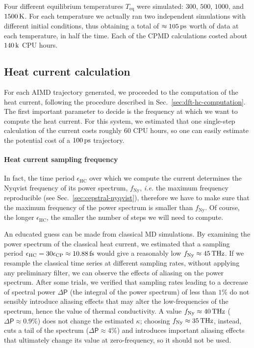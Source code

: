 Four different equilibrium temperatures $T_\mathrm{eq}$ were simulated: $300$, $500$, $1000$, and $1500\,\mathrm{K}$. For each temperature we actually ran two independent simulations with different initial conditions, thus obtaining a total of $\approx 105\,\mathrm{ps}$ worth of data at each temperature, in half the time. 
Each of the CPMD calculations costed about $140\,\mathrm{k}$ CPU hours.



\subsection{Heat current calculation}  \label{sec:results-quantum-current}
For each AIMD trajectory generated, we proceeded to the computation of the \abinitio heat current, following the procedure described in Sec.~\ref{sec:dft-hc-computation}. 
The first important parameter to decide is the frequency at which we want to compute the heat current. For this system, we estimated that one single-step calculation of the current costs roughly $60$ CPU hours, so one can easily estimate the potential cost of a $100\,\mathrm{ps}$ trajectory. 


\paragraph{Heat current sampling frequency}
In fact, the time period $\epsilon_\mathrm{HC}$ over which we compute the current determines the Nyqvist frequency of its power spectrum, $f_\mathrm{Ny}$, \emph{i.e.} the maximum frequency reproducible (see Sec.~\ref{sec:cepstral-nyqvist}), therefore we have to make sure that the maximum frequency of the power spectrum is smaller than $f_\mathrm{Ny}$. Of course, the longer $\epsilon_\mathrm{HC}$, the smaller the number of steps we will need to compute. 

An educated guess can be made from classical MD simulations. By examining the power spectrum of the classical heat current, we estimated that a sampling period $\epsilon_\mathrm{HC} = 30 \epsilon_\mathrm{CP} \approx 10.88\,\mathrm{fs}$ would give a reasonably low $f_\mathrm{Ny}\approx 45\,\mathrm{THz}$. 
If we resample the classical time series at different sampling rates, without applying any preliminary filter, we can observe the effects of aliasing on the power spectrum. 
After some trials, we verified that sampling rates leading to a decrease of spectral power $\Delta\mathsf{P}$ (the integral of the power spectrum) of less than $1\%$ do not sensibly introduce aliasing effects that may alter the low-frequencies of the spectrum, hence the value of thermal conductivity. A value $f_\mathrm{Ny} \approx 40\,\mathrm{THz}$ ($\Delta\mathsf{P} \approx 0.9\%$) does not change the estimated $\kappa$; choosing $f_\mathrm{Ny} \approx 35\,\mathrm{THz}$, instead, cuts a tail of the spectrum ($\Delta\mathsf{P} \approx 4\%$) and introduces important aliasing effects that ultimately change its value at zero-frequency, so it should not be used. 

